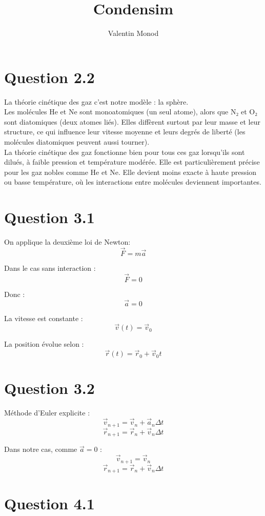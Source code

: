 \documentclass[a4paper]{article}
\begin{document}
\title{\Huge Condensim}
\author{Valentin Monod}
\date{}
\maketitle

\section*{Question 2.2}
    La théorie cinétique des gaz c’est notre modèle : la sphère.\\

    Les molécules He et Ne sont monoatomiques (un seul atome), alors que N₂ et O₂ sont diatomiques (deux atomes liés).
    Elles diffèrent surtout par leur masse et leur structure, ce qui influence leur vitesse moyenne et leurs degrés de liberté (les molécules diatomiques peuvent aussi tourner).\\

    La théorie cinétique des gaz fonctionne bien pour tous ces gaz lorsqu’ils sont dilués, à faible pression et température modérée.
    Elle est particulièrement précise pour les gaz nobles comme He et Ne.
    Elle devient moins exacte à haute pression ou basse température, où les interactions entre molécules deviennent importantes.

\section*{Question 3.1}
    On applique la deuxième loi de Newton: $$\vec{F} = m \vec{a}$$

    Dans le cas sans interaction : $$\vec{F} = 0$$

    Donc : $$\vec{a} = 0$$

    La vitesse est constante : $$\vec{v}(t) = \vec{v}_0$$

    La position évolue selon : $$\vec{r}(t) = \vec{r}_0 + \vec{v}_0 t$$

\section*{Question 3.2}
    Méthode d'Euler explicite :
    $$\vec{v}_{n+1} = \vec{v}_n + \vec{a}_n \Delta t$$
    $$\vec{r}_{n+1} = \vec{r}_n + \vec{v}_n \Delta t$$

    Dans notre cas, comme $\vec{a}=0$ :
    $$\vec{v}_{n+1} = \vec{v}_n$$
    $$\vec{r}_{n+1} = \vec{r}_n + \vec{v}_n \Delta t$$

\section*{Question 4.1}
\end{document}
